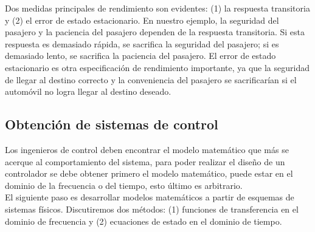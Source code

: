 Dos medidas principales de rendimiento son evidentes: (1) la respuesta transitoria y (2) el error
de estado estacionario. En nuestro ejemplo, la seguridad del pasajero y la paciencia del pasajero
dependen de la respuesta transitoria. Si esta respuesta es demasiado rápida, se sacrifica la
seguridad del pasajero; si es demasiado lento, se sacrifica la paciencia del pasajero.
El error de estado estacionario es otra especificación de rendimiento importante, ya que la seguridad
de llegar al destino correcto y la conveniencia del pasajero se sacrificarían si el automóvil no
logra llegar al destino deseado.

\subsection{Obtención de sistemas de control}
Los ingenieros de control deben encontrar el modelo matemático que más se acerque
al comportamiento del sistema, para poder realizar el diseño de un controlador se
debe obtener primero el modelo matemático, puede estar en el dominio de la frecuencia
o del tiempo, esto último es arbitrario.\\
El siguiente paso es desarrollar modelos matemáticos a partir de esquemas de sistemas
físicos. Discutiremos dos métodos: (1) funciones de transferencia en el dominio de
frecuencia y (2) ecuaciones de estado en el dominio de tiempo.
